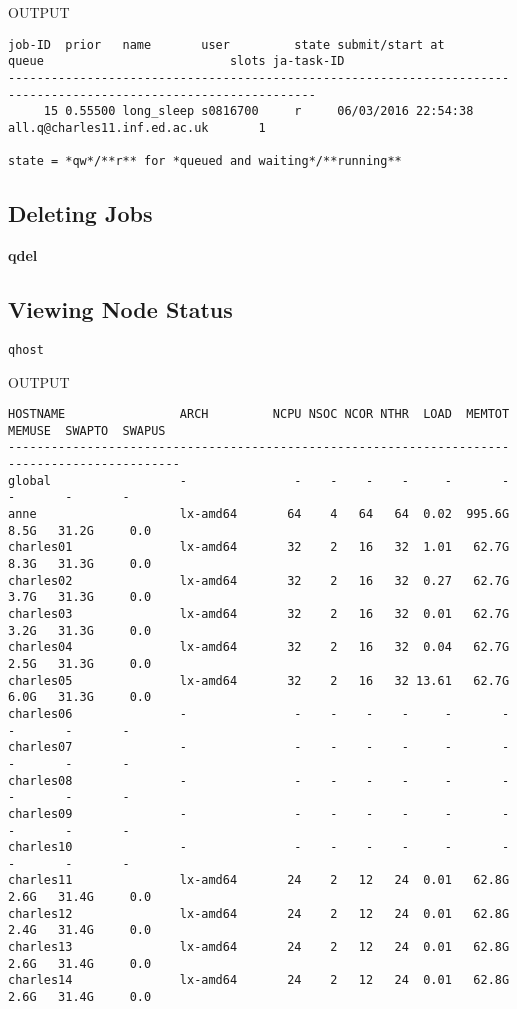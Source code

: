 \documentclass[]{article}
\newenvironment{Shaded}{\begin{snugshade}}{\end{snugshade}}
\newcommand{\KeywordTok}[1]{\textcolor[rgb]{0.13,0.29,0.53}{\textbf{{#1}}}}
\begin{document}
OUTPUT

\begin{verbatim}
job-ID  prior   name       user         state submit/start at     queue                          slots ja-task-ID 
-----------------------------------------------------------------------------------------------------------------
     15 0.55500 long_sleep s0816700     r     06/03/2016 22:54:38 all.q@charles11.inf.ed.ac.uk       1 

state = *qw*/**r** for *queued and waiting*/**running**
\end{verbatim}

\subsection{Deleting Jobs}\label{deleting-jobs}

\begin{Shaded}
\begin{Highlighting}[]
\KeywordTok{qdel}
\end{Highlighting}
\end{Shaded}

\subsection{Viewing Node Status}\label{viewing-node-status}

\texttt{qhost}

OUTPUT

\begin{verbatim}
HOSTNAME                ARCH         NCPU NSOC NCOR NTHR  LOAD  MEMTOT  MEMUSE  SWAPTO  SWAPUS
----------------------------------------------------------------------------------------------
global                  -               -    -    -    -     -       -       -       -       -
anne                    lx-amd64       64    4   64   64  0.02  995.6G    8.5G   31.2G     0.0
charles01               lx-amd64       32    2   16   32  1.01   62.7G    8.3G   31.3G     0.0
charles02               lx-amd64       32    2   16   32  0.27   62.7G    3.7G   31.3G     0.0
charles03               lx-amd64       32    2   16   32  0.01   62.7G    3.2G   31.3G     0.0
charles04               lx-amd64       32    2   16   32  0.04   62.7G    2.5G   31.3G     0.0
charles05               lx-amd64       32    2   16   32 13.61   62.7G    6.0G   31.3G     0.0
charles06               -               -    -    -    -     -       -       -       -       -
charles07               -               -    -    -    -     -       -       -       -       -
charles08               -               -    -    -    -     -       -       -       -       -
charles09               -               -    -    -    -     -       -       -       -       -
charles10               -               -    -    -    -     -       -       -       -       -
charles11               lx-amd64       24    2   12   24  0.01   62.8G    2.6G   31.4G     0.0
charles12               lx-amd64       24    2   12   24  0.01   62.8G    2.4G   31.4G     0.0
charles13               lx-amd64       24    2   12   24  0.01   62.8G    2.6G   31.4G     0.0
charles14               lx-amd64       24    2   12   24  0.01   62.8G    2.6G   31.4G     0.0
\end{verbatim}
\end{document}
